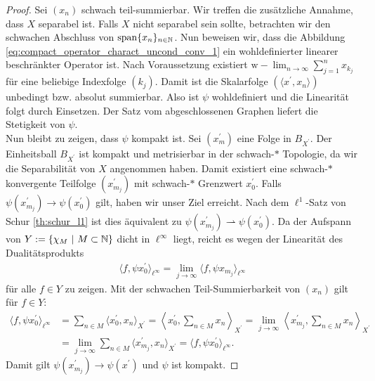 \begin{proof}
	Sei $ (x_n) $ schwach teil-summierbar.
	Wir treffen die zusätzliche Annahme, dass $ X $ separabel ist.
	Falls $ X $ nicht separabel sein sollte, betrachten wir den schwachen Abschluss von $ \mathrm{span} \{x_n\}_{n \in \mathbb{N}} $.
	Nun beweisen wir, dass die Abbildung \eqref{eq:compact_operator_charact_uncond_conv_1} ein wohldefinierter linearer beschränkter Operator ist.
	Nach Voraussetzung existiert $ \mathrm{w}- \lim_{n \to \infty}
	\sum_{j =1}^n x_{k_j} $
	für eine beliebige Indexfolge $ (k_j) $.
	Damit ist die Skalarfolge $ (\langle x^\prime , x_n \rangle) $ unbedingt bzw. absolut summierbar.
	Also ist $ \psi $ wohldefiniert und die Linearität folgt durch Einsetzen.
	Der Satz vom abgeschlossenen Graphen liefert die Stetigkeit von $ \psi $.\\
	Nun bleibt zu zeigen, dass $ \psi $ kompakt ist.
	Sei $ (x^\prime_m) $ eine Folge in $ B_{X^\prime} $.
	Der Einheitsball $ B_{X^\prime} $ ist kompakt und metrisierbar in der schwach-$ \ast $ Topologie, da wir die Separabilität von $ X $ angenommen haben.
	Damit existiert eine schwach-$ \ast $ konvergente Teilfolge $ (x^\prime_{m_j}) $
	mit schwach-$ \ast $ Grenzwert $ x_0^\prime $.
	Falls $ \psi(x^\prime_{m_j}) \rightarrow \psi(x_0^\prime)$ gilt, haben wir unser Ziel erreicht. 
	Nach dem $ \ell^1 $-Satz von Schur \ref{th:schur_l1} ist dies äquivalent zu
	$ \psi(x^\prime_{m_j}) \rightharpoonup \psi(x_0^\prime)$.
	Da der Aufspann von $ Y := \{
	\chi_M \ | \ M \subset \mathbb{N}
	\} $ dicht in $ \ell^\infty $ liegt, reicht es wegen der Linearität des Dualitätsprodukts
	\begin{align*}
		\langle f, \psi x_0^\prime \rangle_{\ell^\infty} 
		=
		\lim \limits_{j \to  \infty} 
		\langle f, \psi x_{m_j} \rangle_{\ell^\infty} 
	\end{align*}
	für alle $ f \in Y $ zu zeigen.
	Mit der  schwachen Teil-Summierbarkeit von $ (x_n) $ gilt für $ f \in Y $:
	\begin{align*}
		\langle f , \psi x_0^\prime \rangle_{\ell^\infty} 
		&=
		\sum \limits_{n \in M} \langle x_0^\prime, x_n \rangle_{X^\prime }
		=
		\left\langle x_0^\prime,
		\sum \limits_{n \in M } x_n
		\right\rangle_{X^\prime }
		=
		\lim\limits_{j \to \infty}
		\left\langle x_{m_j}^\prime,
		\sum \limits_{n \in M } x_n
		\right\rangle_{X^\prime }\\
		&=
		\lim\limits_{j \to \infty}
		\sum \limits_{n \in M} \langle x_{m_j}^\prime, x_n \rangle_{X^\prime }
		=
		\langle f , \psi x_0^\prime \rangle_{\ell^\infty}. 
	\end{align*}
	Damit gilt $ \psi(x^\prime_{m_j}) \rightarrow \psi(x^\prime)$ und $ \psi $ ist kompakt.
\end{proof}

